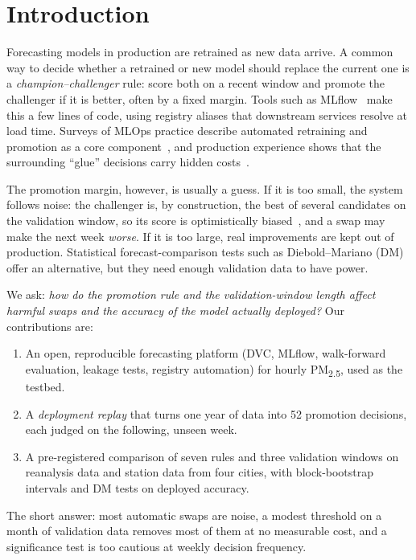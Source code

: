 \documentclass[conference]{IEEEtran}
\begin{document}
\section{Introduction}

Forecasting models in production are retrained as new data arrive. A common way to decide
whether a retrained or new model should replace the current one is a \emph{champion--challenger}
rule: score both on a recent window and promote the challenger if it is better, often by a fixed
margin. Tools such as MLflow~\cite{zaharia2018} make this a few lines of code, using registry
aliases that downstream services resolve at load time. Surveys of MLOps practice describe automated
retraining and promotion as a core component~\cite{kreuzberger2023}, and production experience shows
that the surrounding ``glue'' decisions carry hidden costs~\cite{sculley2015,breck2017}.

The promotion margin, however, is usually a guess. If it is too small, the system follows noise: the
challenger is, by construction, the best of several candidates on the validation window, so its score is
optimistically biased~\cite{cawley2010}, and a swap may make the next week \emph{worse}. If it is
too large, real improvements are kept out of production. Statistical forecast-comparison tests such
as Diebold--Mariano (DM)~\cite{diebold1995,harvey1997} offer an alternative, but they need enough
validation data to have power.

We ask: \emph{how do the promotion rule and the validation-window length affect harmful swaps
and the accuracy of the model actually deployed?} Our contributions are:
\begin{enumerate}
  \item An open, reproducible forecasting platform (DVC, MLflow, walk-forward evaluation, leakage
        tests, registry automation) for hourly PM\textsubscript{2.5}, used as the testbed.
  \item A \emph{deployment replay} that turns one year of data into 52 promotion decisions, each
        judged on the following, unseen week.
  \item A pre-registered comparison of seven rules and three validation windows on reanalysis
        data and station data from four cities, with block-bootstrap intervals and DM tests on
        deployed accuracy.
\end{enumerate}
The short answer: most automatic swaps are noise, a modest threshold on a month of validation
data removes most of them at no measurable cost, and a significance test is too cautious at
weekly decision frequency.
\end{document}
